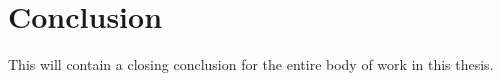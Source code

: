 \chapter{Conclusion}
\label{chap:conclusion}
This will contain a closing conclusion for the entire body of work in this thesis.
